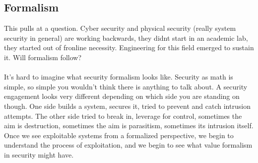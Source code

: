 \documentclass{article}
\begin{document}
	\subsection{Formalism}
	This pulls at a question. Cyber security and physical security (really system security in general) are working backwards, they didnt start in an academic lab, they started out of fronline necessity. Engineering for this field emerged to sustain it. Will formalism follow?\\\\
	It's hard to imagine what security formalism looks like. Security as math is simple, so simple you wouldn't think there is anything to talk about. A security engagement looks very different depending on which side you are standing on though. One side builds a system, secures it, tried to prevent and catch intrusion attempts. The other side tried to break in, leverage for control, sometimes the aim is destruction, sometimes the aim is parasitism, sometimes its intrusion itself. Once we see exploitable systems from a formalized perspective, we begin to understand the process of exploitation, and we begin to see what value formalism in security might have. 
\end{document}
